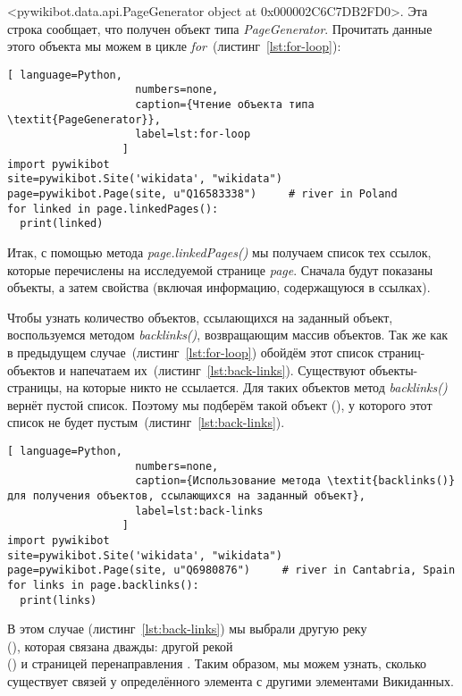 <pywikibot.data.api.PageGenerator object at 0x000002C6C7DB2FD0>.
Эта строка сообщает, что получен объект типа \textit{PageGenerator}. Прочитать данные этого объекта мы можем в цикле \textit{for}~(листинг~\ref{lst:for-loop}):

\begin{lstlisting}[ language=Python,
                    numbers=none,
                    caption={Чтение объекта типа \textit{PageGenerator}},
                    label=lst:for-loop
                  ]
import pywikibot
site=pywikibot.Site('wikidata', "wikidata")
page=pywikibot.Page(site, u"Q16583338")     # river in Poland
for linked in page.linkedPages():
  print(linked)
\end{lstlisting}

Итак, с помощью метода \textit{page.linkedPages()} мы получаем список тех ссылок, которые перечислены на исследуемой странице \textit{page}. Сначала будут показаны объекты, а затем свойства (включая информацию, содержащуюся в ссылках).

Чтобы узнать количество объектов, ссылающихся на заданный объект, воспользуемся методом \textit{backlinks()}, возвращающим массив объектов. Так же как в предыдущем случае~(листинг~\ref{lst:for-loop}) обойдём этот список страниц-объектов и напечатаем их~(листинг~\ref{lst:back-links}). Существуют объекты-страницы, на которые никто не ссылается. Для таких объектов метод \textit{backlinks()} вернёт пустой список. Поэтому мы подберём такой объект (), у которого этот список не будет пустым~(листинг~\ref{lst:back-links}).

\begin{lstlisting}[ language=Python,
                    numbers=none,
                    caption={Использование метода \textit{backlinks()} для получения объектов, ссылающихся на заданный объект},
                    label=lst:back-links
                  ]
import pywikibot
site=pywikibot.Site('wikidata', "wikidata")
page=pywikibot.Page(site, u"Q6980876")     # river in Cantabria, Spain
for links in page.backlinks():
  print(links)
\end{lstlisting}

В этом случае (листинг~\ref{lst:back-links}) мы выбрали другую реку \\(), которая связана дважды: другой рекой \\() и страницей перенаправления . Таким образом, мы можем узнать, сколько существует связей у определённого элемента с другими элементами Викиданных.

